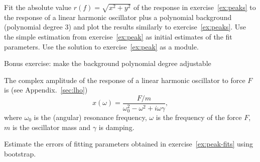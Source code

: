 \begin{exercise}
    \label{ex:peak-fits}
    Fit the absolute value $r(f) = \sqrt{x^2 + y^2}$ of the response in exercise~\ref{ex:peaks} to the response of a linear harmonic oscillator plus a polynomial background (polynomial degree 3) and plot the results similarly to exercise~\ref{ex:peaks}. Use the simple estimation from exercise~\ref{ex:peak} as initial estimates of the fit parameters. Use the solution to exercise~\ref{ex:peak} as a module.

    Bonus exercise: make the background polynomial degree adjustable

    The complex amplitude of the response of a linear harmonic oscillator to force $F$ is (see Appendix.~\ref{sec:lho})
    \begin{equation}
        x(\omega) = \frac{F/m}{\omega_0^2 - \omega^2 + i\omega\gamma},
    \end{equation}
    where $\omega_0$ is the (angular) resonance frequency, $\omega$ is the frequency of the force $F$, $m$ is the oscillator mass and $\gamma$ is damping.
\end{exercise}
\begin{exercise}
    Estimate the errors of fitting parameters obtained in exercise~\ref{ex:peak-fits} using bootstrap.
\end{exercise}


